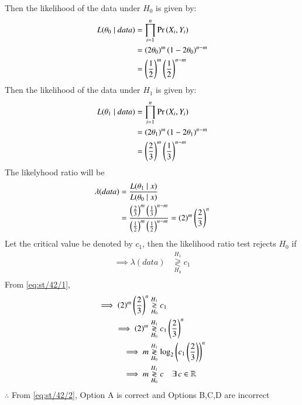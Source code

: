 \documentclass[article]{IEEEtran}
\theoremstyle{remark}
\begin{document}
Then the likelihood of the data under $H_0$ is given by: 
\begin{align}
    L(\theta_0 \mid data) &= \prod_{i=1}^{n} \Pr\left(X_i, Y_i\right) \\
    &= \left(2\theta_0\right)^m\left(1 - 2\theta_0\right)^{n-m}\\
    &= \left(\frac{1}{2}\right)^m\left(\frac{1}{2}\right)^{n-m}
\end{align}
Then the likelihood of the data under $H_1$ is given by:
\begin{align}
    L(\theta_1 \mid data) &= \prod_{i=1}^{n} \Pr\left(X_i, Y_i\right) \\
    &= \left(2\theta_1\right)^m\left(1 - 2\theta_1\right)^{n-m}\\
    &= \left(\frac{2}{3}\right)^m\left(\frac{1}{3}\right)^{n-m}
\end{align}
The likelyhood ratio will be 
\begin{align}
    \lambda(data) &= \frac{L(\theta_1 \mid x)}{L(\theta_0 \mid x)} \\
    &= \frac{\left(\frac{2}{3}\right)^m\left(\frac{1}{3}\right)^{n-m}}{\left(\frac{1}{2}\right)^m\left(\frac{1}{2}\right)^{n-m}} = \left(2\right)^m\left(\frac{2}{3}\right)^{n} \label{eq:st/42/1}
\end{align}
Let the critical value be denoted by $c_1$, then the likelihood ratio test rejects $H_0$ if
\begin{align}
    \implies  \lambda(data) &\overset{H_1}{\underset{H_0}{\gtrless}} c_1\\
\end{align}  
From \eqref{eq:st/42/1},
\begin{align}
    \implies  \left(2\right)^m\left(\frac{2}{3}\right)^{n} &\overset{H_1}{\underset{H_0}{\gtrless}} c_1\\
    \implies  \left(2\right)^m &\overset{H_1}{\underset{H_0}{\gtrless}} c_1\left(\frac{2}{3}\right)^{n}\\
    \implies  m &\overset{H_1}{\underset{H_0}{\gtrless}} \log_{2}\left(c_1\left(\frac{2}{3}\right)\right)^{n}\\
    \implies  m &\overset{H_1}{\underset{H_0}{\gtrless}} c \quad \exists \, c \in \mathbb{R} \label{eq:st/42/2}
\end{align}
$\therefore$ From \eqref{eq:st/42/2}, Option A is correct and Options B,C,D are incorrect
\end{document}
